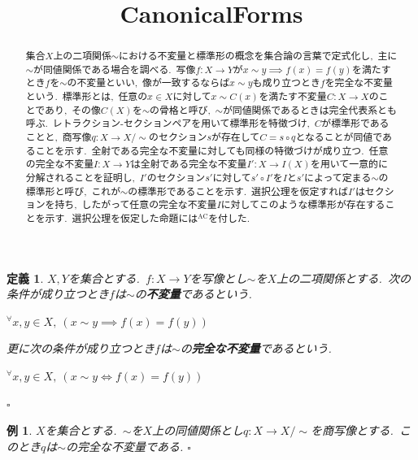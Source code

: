 \documentclass[uplatex,dvipdfmx]{jsarticle}
\title{CanonicalForms}
\date{}
\author{}
\theoremstyle{noperiod}
\newtheorem{definition}{定義}
\newtheorem{example}{例}
\begin{document}
\maketitle

\begin{abstract}
集合$X$上の二項関係$\sim$における不変量と標準形の概念を集合論の言葉で定式化し,\ 主に$\sim$が同値関係である場合を調べる.\
写像$f \colon X \to Y$が$x \sim y \implies f(x) = f(y)$を満たすとき$f$を$\sim$の不変量といい,\ 像が一致するならば$x \sim y$も成り立つとき$f$を完全な不変量という.\ 標準形とは,\ 任意の$x \in X$に対して$x \sim C(x)$を満たす不変量$C \colon X \to X$のことであり,\ その像$C(X)$を$\sim$の骨格と呼び,\ $\sim$が同値関係であるときは完全代表系とも呼ぶ.\ レトラクション-セクションペアを用いて標準形を特徴づけ,\ $C$が標準形であることと,\ 商写像$q \colon X \to X/\sim$のセクション$s$が存在して$C = s \circ q$となることが同値であることを示す.\ 全射である完全な不変量に対しても同様の特徴づけが成り立つ.\ 任意の完全な不変量$I \colon X \to Y$は全射である完全な不変量$I' \colon X \to I(X)$を用いて一意的に分解されることを証明し,\ $I'$のセクション$s'$に対して$s' \circ I'$を$I$と$s'$によって定まる$\sim$の標準形と呼び,\ これが$\sim$の標準形であることを示す.\ 選択公理を仮定すれば$I'$はセクションを持ち,\ したがって任意の完全な不変量$I$に対してこのような標準形が存在することを示す.\ 選択公理を仮定した命題には$^{\textrm{AC}}$を付した.
\end{abstract}

\begin{definition}
$X,Y$を集合とする.\ $f \colon X \to Y$を写像とし$\sim$を$X$上の二項関係とする.\ 次の条件が成り立つとき$f$は$\sim$の\textbf{不変量}であるという.
\begin{center}
  ${^{\forall}x,y} \in X,\ (x \sim y \implies f(x) = f(y))$
\end{center}
更に次の条件が成り立つとき$f$は$\sim$の\textbf{完全な不変量}であるという.
\begin{center}
  ${^{\forall}x,y} \in X,\ (x \sim y \iff f(x) = f(y))$
\end{center}
\hfill $\square$
\end{definition}

\begin{example}
$X$を集合とする.\ $\sim$を$X$上の同値関係とし$q \colon X \to X/\sim$を商写像とする.\ このとき$q$は$\sim$の完全な不変量である.
\hfill $\square$
\end{example}
\end{document}
